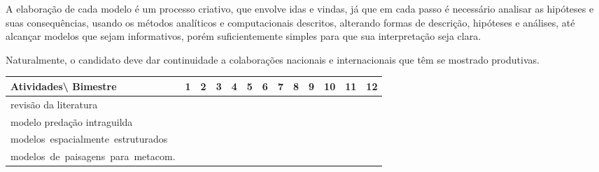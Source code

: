 \documentclass[12pt]{extarticle}
\begin{document}
A elaboração de cada modelo é um processo criativo, que envolve idas e vindas,
já que em cada passo é necessário analisar as hipóteses e suas consequências,
usando os métodos analíticos e computacionais descritos, alterando formas de
descrição, hipóteses e análises, até alcançar modelos que sejam informativos,
porém suficientemente simples para que sua interpretação seja clara. 

Naturalmente, o candidato deve dar continuidade a colaborações nacionais e
internacionais que têm se mostrado produtivas.

\begin{table}[htb] 
\small
\noindent
\begin{tabular}{p{6cm}|p{0.3cm}p{0.3cm}p{0.3cm}p{0.3cm}p{0.3cm}p{0.3cm}p{0.3cm}p{0.3cm}p{0.3cm}p{0.3cm}p{0.3cm}p{0.3cm}}
    {\normalsize Atividades\textbackslash\hspace{0.1cm} Bimestre} & 1 & 2 & 3 & 4 & 5 & 6 & 7 & 8
                                                                & 9 & 10 & 11 & 12 \\ \hline 
                                              revisão da literatura& \cellcolor[gray]{0.8} & \cellcolor[gray]{0.8} &  &  &  &  &  &  &  &  &  &   \\
                                    modelo predação intraguilda &
                                          \cellcolor[gray]{0.8} &
                                          \cellcolor[gray]{0.8} &
                                          \cellcolor[gray]{0.8} &
                                          \cellcolor[gray]{0.8} &
                                          \cellcolor[gray]{0.8} & & & & & & & \\
                                    \mbox{modelos espacialmente estruturados} & & & &
                                          \cellcolor[gray]{0.8} &
                                          \cellcolor[gray]{0.8} &
                                          \cellcolor[gray]{0.8} &
                                          \cellcolor[gray]{0.8} &
                                          \cellcolor[gray]{0.8} & & & & \\
                                    \mbox{modelos de paisagens para metacom.} & & & & & & &
                                          \cellcolor[gray]{0.8} &
                                          \cellcolor[gray]{0.8} &
                                          \cellcolor[gray]{0.8} &
                                          \cellcolor[gray]{0.8} &
                                          \cellcolor[gray]{0.8} & \\

\end{tabular}
\end{table}
\end{document}
